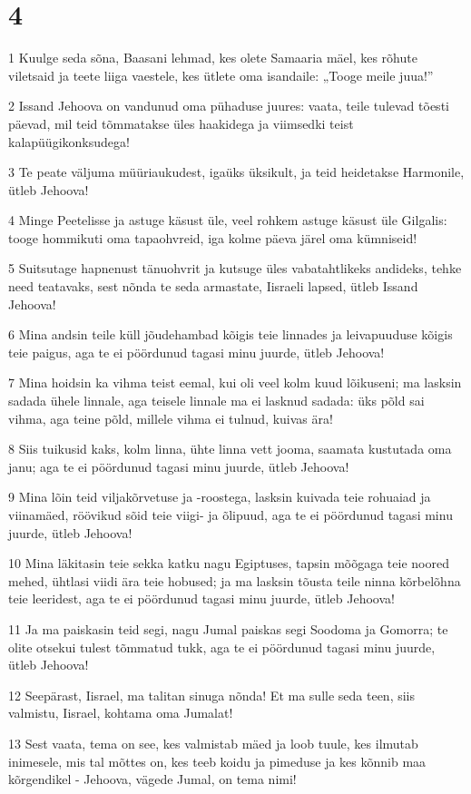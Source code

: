 \chapter{4}

\par 1 Kuulge seda sõna, Baasani lehmad, kes olete Samaaria mäel, kes rõhute viletsaid ja teete liiga vaestele, kes ütlete oma isandaile: „Tooge meile juua!”
\par 2 Issand Jehoova on vandunud oma pühaduse juures: vaata, teile tulevad tõesti päevad, mil teid tõmmatakse üles haakidega ja viimsedki teist kalapüügikonksudega!
\par 3 Te peate väljuma müüriaukudest, igaüks üksikult, ja teid heidetakse Harmonile, ütleb Jehoova!
\par 4 Minge Peetelisse ja astuge käsust üle, veel rohkem astuge käsust üle Gilgalis: tooge hommikuti oma tapaohvreid, iga kolme päeva järel oma kümniseid!
\par 5 Suitsutage hapnenust tänuohvrit ja kutsuge üles vabatahtlikeks andideks, tehke need teatavaks, sest nõnda te seda armastate, Iisraeli lapsed, ütleb Issand Jehoova!
\par 6 Mina andsin teile küll jõudehambad kõigis teie linnades ja leivapuuduse kõigis teie paigus, aga te ei pöördunud tagasi minu juurde, ütleb Jehoova!
\par 7 Mina hoidsin ka vihma teist eemal, kui oli veel kolm kuud lõikuseni; ma lasksin sadada ühele linnale, aga teisele linnale ma ei lasknud sadada: üks põld sai vihma, aga teine põld, millele vihma ei tulnud, kuivas ära!
\par 8 Siis tuikusid kaks, kolm linna, ühte linna vett jooma, saamata kustutada oma janu; aga te ei pöördunud tagasi minu juurde, ütleb Jehoova!
\par 9 Mina lõin teid viljakõrvetuse ja -roostega, lasksin kuivada teie rohuaiad ja viinamäed, röövikud sõid teie viigi- ja õlipuud, aga te ei pöördunud tagasi minu juurde, ütleb Jehoova!
\par 10 Mina läkitasin teie sekka katku nagu Egiptuses, tapsin mõõgaga teie noored mehed, ühtlasi viidi ära teie hobused; ja ma lasksin tõusta teile ninna kõrbelõhna teie leeridest, aga te ei pöördunud tagasi minu juurde, ütleb Jehoova!
\par 11 Ja ma paiskasin teid segi, nagu Jumal paiskas segi Soodoma ja Gomorra; te olite otsekui tulest tõmmatud tukk, aga te ei pöördunud tagasi minu juurde, ütleb Jehoova!
\par 12 Seepärast, Iisrael, ma talitan sinuga nõnda! Et ma sulle seda teen, siis valmistu, Iisrael, kohtama oma Jumalat!
\par 13 Sest vaata, tema on see, kes valmistab mäed ja loob tuule, kes ilmutab inimesele, mis tal mõttes on, kes teeb koidu ja pimeduse ja kes kõnnib maa kõrgendikel - Jehoova, vägede Jumal, on tema nimi!

